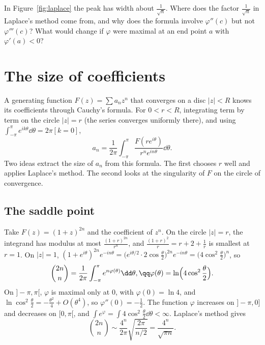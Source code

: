 \begin{think}
In Figure~\ref{fig:laplace} the peak has width about $\frac1{\sqrt n}$. Where does the factor $\frac1{\sqrt n}$ in Laplace's method come from, and why does
the formula involve $\varphi''(c)$ but not $\varphi'''(c)$? What would change if $\varphi$ were maximal at an end point $a$ with $\varphi'(a)<0$?
\end{think}

\section{The size of coefficients}

A generating function $F(z)=\sum a_nz^n$ that converges on a disc $|z|<R$ knows its coefficients through Cauchy's formula. For $0<r<R$,
integrating term by term on the circle $|z|=r$ (the series converges uniformly there), and using $\int_{-\pi}^\pi e^{ik\theta}\dd\theta=2\pi[k=0]$,
\[
a_n=\frac1{2\pi}\int_{-\pi}^\pi\frac{F(re^{i\theta})}{r^ne^{in\theta}}\dd\theta.
\]
Two ideas extract the size of $a_n$ from this formula. The first chooses $r$ well and applies Laplace's method. The second looks at the
singularity of $F$ on the circle of convergence.

\subsection*{The saddle point}

\begin{example}\label{ex:centralsaddle}
Take $F(z)=(1+z)^{2n}$ and the coefficient of $z^n$. On the circle $|z|=r$, the integrand has modulus at most $\frac{(1+r)^{2n}}{r^n}$, and
$\frac{(1+r)^2}r=r+2+\frac1r$ is smallest at $r=1$. On $|z|=1$, $(1+e^{i\theta})^{2n}e^{-in\theta}=\bigl(e^{i\theta/2}\cdot2\cos\frac\theta2\bigr)^{2n}e^{-in\theta}=\bigl(4\cos^2\frac\theta2\bigr)^n$, so
\[
\begin{gathered}\binom{2n}n=\frac1{2\pi}\int_{-\pi}^\pi e^{n\varphi(\theta)}\dd\theta,\qq\varphi(\theta)=\ln\Bigl(4\cos^2\frac\theta2\Bigr).\end{gathered}
\]
On $]-\pi,\pi[$, $\varphi$ is maximal only at $0$, with $\varphi(0)=\ln4$, and $\ln\cos^2\frac\theta2=-\frac{\theta^2}4+O(\theta^4)$, so $\varphi''(0)=-\frac12$. The function $\varphi$
increases on $]-\pi,0]$ and decreases on $[0,\pi[$, and $\int e^\varphi=\int4\cos^2\frac\theta2\dd\theta<\infty$. Laplace's method gives
\[
\binom{2n}n\sim\frac{4^n}{2\pi}\sqrt{\frac{2\pi}{n/2}}=\frac{4^n}{\sqrt{\pi n}}.
\]
\end{example}

